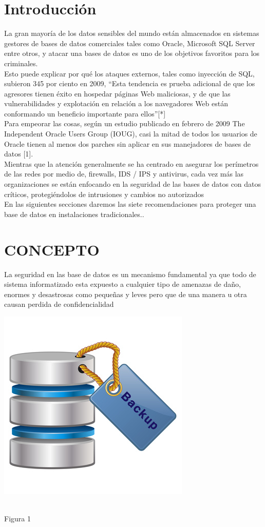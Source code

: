 \documentclass[conference]{IEEEtran}
\begin{document}
\section{Introducci\'on}
La gran mayoría de los datos sensibles del mundo están almacenados en sistemas gestores de bases de datos comerciales tales como Oracle, Microsoft SQL Server entre otros, y atacar una bases de datos es uno de los objetivos favoritos para los criminales.
\\
Esto puede explicar por qué los ataques externos, tales como inyección de SQL, subieron 345 por ciento en 2009, “Esta tendencia es prueba adicional de que los agresores tienen éxito en hospedar páginas Web maliciosas, y de que las vulnerabilidades y explotación en relación a los navegadores Web están conformando un beneficio importante para ellos”[*]
\\
Para empeorar las cosas, según un estudio publicado en febrero de 2009 The Independent Oracle Users Group (IOUG), casi la mitad de todos los usuarios de Oracle tienen al menos dos parches sin aplicar en sus manejadores de bases de datos [1].
\\
 Mientras que la atención generalmente se ha centrado en asegurar los perímetros de las redes por medio de, firewalls, IDS / IPS y antivirus, cada vez más las organizaciones se están enfocando en la seguridad de las bases de datos con datos críticos, protegiéndolos de intrusiones y cambios no autorizados
\\
En las siguientes secciones daremos las siete recomendaciones para proteger una base de datos en instalaciones tradicionales..
\\

\section{CONCEPTO}

La seguridad en las base de datos es un mecanismo fundamental ya que todo de sistema informatizado esta expuesto a cualquier tipo de amenazas de daño, enormes y desastrosas como pequeñas y leves pero que de una manera u otra causan perdida de confidencialidad
\\
\begin{flushright}
  \includegraphics[scale=0.5]{Imagenes/backup.jpg}
\end{flushright}
\centering
\\Figura 1
\end{document}
